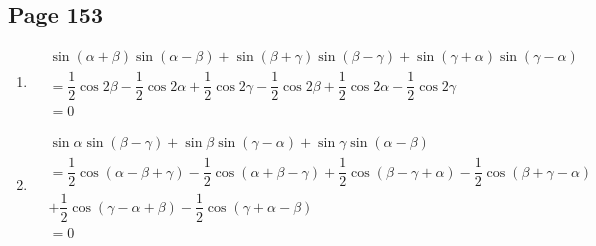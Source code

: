 \documentclass{article}
\newenvironment{solutions}[1]
{\subsection*{#1}
 \begin{enumerate}[leftmargin=1.5em]}
{\end{enumerate}}
\newcommand{\solution}{\item}
\begin{document}
\begin{solutions}{Page 153}
\solution %
\begin{align*}
&\sin\left(\alpha+\beta\right)\sin\left(\alpha-\beta\right) + \sin\left(\beta+\gamma\right)\sin\left(\beta-\gamma\right) + \sin\left(\gamma+\alpha\right)\sin\left(\gamma-\alpha\right) \\
&= \dfrac{1}{2}\cos{2\beta} - \dfrac{1}{2}\cos{2\alpha} + \dfrac{1}{2}\cos{2\gamma} - \dfrac{1}{2}\cos{2\beta} + \dfrac{1}{2}\cos{2\alpha} - \dfrac{1}{2}\cos{2\gamma} \\
&= 0
\end{align*}

\solution %
\begin{align*}
&\sin{\alpha}\sin\left(\beta-\gamma\right) + \sin{\beta}\sin\left(\gamma-\alpha\right) + \sin{\gamma}\sin\left(\alpha-\beta\right) \\
&= \dfrac{1}{2}\cos\left(\alpha-\beta+\gamma\right) - \dfrac{1}{2}\cos\left(\alpha+\beta-\gamma\right) + \dfrac{1}{2}\cos\left(\beta-\gamma+\alpha\right) - \dfrac{1}{2}\cos\left(\beta+\gamma-\alpha\right) \\
&+ \dfrac{1}{2}\cos\left(\gamma-\alpha+\beta\right) - \dfrac{1}{2}\cos\left(\gamma+\alpha-\beta\right) \\
&= 0
\end{align*}

\end{solutions}
\end{document}
